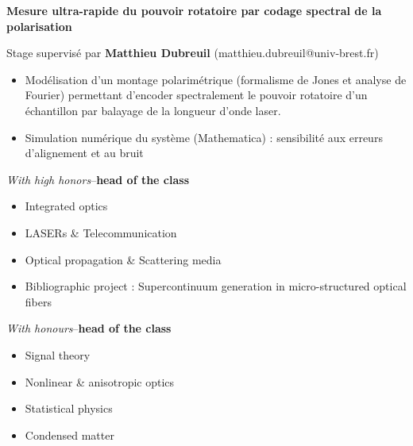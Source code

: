 \documentclass[9pt,a4paper,academicons]{altacv}
\begin{document}

\textbf{Mesure ultra-rapide du pouvoir rotatoire par codage spectral de la
	polarisation}\smallskip
	
	Stage supervisé par \textbf{Matthieu Dubreuil} (matthieu.dubreuil@univ-brest.fr)
	\smallskip
\small{
	\begin{itemize}
		\item Modélisation d'un montage polarimétrique (formalisme de Jones et analyse de Fourier) permettant d'encoder spectralement le pouvoir rotatoire d'un échantillon par balayage de la longueur d'onde laser.
		\item Simulation numérique du système (Mathematica) : sensibilité aux erreurs d'alignement et au bruit
	\end{itemize}
}





\hfill \textit{With high honors}--\textbf{head of the class}
\vspace{-1em}\small{
	
  \begin{itemize}
    \item Integrated optics
    \item LASERs \& Telecommunication
    \item Optical propagation  \& Scattering media
    \item Bibliographic project : Supercontinuum generation in micro-structured optical fibers
  \end{itemize}
}

\divider

\hfill\textit{With honours}--\textbf{head of the class}
\vspace{-1em}\small{
  \begin{itemize}
    \item Signal theory
    \item Nonlinear \& anisotropic optics
    \item Statistical physics
    \item Condensed matter
  \end{itemize}
}
\divider
\end{document}
